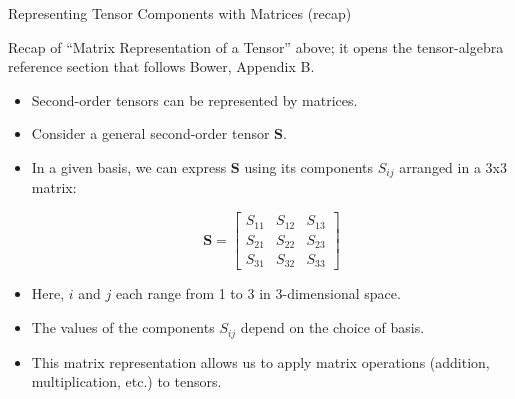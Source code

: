 \documentclass[aspectratio=169,11pt]{beamer}
\begin{document}
\begin{frame}{Representing Tensor Components with Matrices (recap)}
    {\footnotesize\color{DarkGray}Recap of ``Matrix Representation of a Tensor'' above; it opens the tensor-algebra reference section that follows Bower, Appendix B.\par}
    \begin{itemize}
        \item   Second-order tensors can be represented by matrices.

        \item   Consider a general second-order tensor \( \mathbf{S} \).

        \item   In a given basis, we can express \(\mathbf{S}\) using its components \(S_{ij}\) arranged in a 3x3 matrix:

            \[
            \mathbf{S} =
            \begin{bmatrix}
                S_{11} & S_{12} & S_{13} \\
                S_{21} & S_{22} & S_{23} \\
                S_{31} & S_{32} & S_{33}
            \end{bmatrix}
            \]

        \item   Here, \(i\) and \(j\) each range from 1 to 3 in 3-dimensional space.

        \item   The values of the components \(S_{ij}\) depend on the choice of basis.

        \item   This matrix representation allows us to apply matrix operations (addition, multiplication, etc.) to tensors.
    \end{itemize}
\end{frame}
\end{document}
